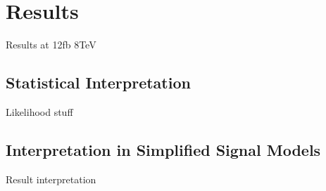 \chapter{Results}
\label{chap:SUSYresults}

Results at 12fb 8TeV

\section{Statistical Interpretation}
\label{sec:resultsintro}

Likelihood stuff

\section{Interpretation in Simplified Signal Models}
\label{sec:resultsms}

Result interpretation



